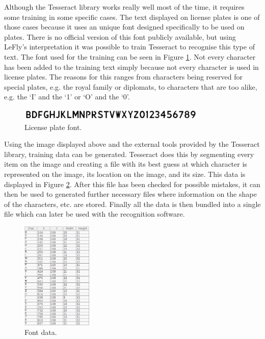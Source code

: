 \clearpage


Although the Tesseract library works really well most of the time, it requires some training in some specific cases. The text displayed on license plates is one of those cases because it uses an unique font designed specifically to be used on plates. There is no official version of this font publicly available, but using LeFly's \cite{lefly} interpretation it was possible to train Tesseract to recognise this type of text. The font used for the training can be seen in Figure \ref{fig:plate-font}. Not every character has been added to the training text simply because not every character is used in license plates. The reasons for this ranges from characters being reserved for special plates, e.g. the royal family or diplomats, to characters that are too alike, e.g. the `I' and the `1' or `O' and the `0'.

\begin{figure}[ht]
    \centering
    \includegraphics[width=0.8\textwidth]{plaatjes/font}
    \caption{License plate font.}
    \label{fig:plate-font}
\end{figure}%

Using the image displayed above and the external tools provided by the Tesseract library, training data can be generated. Tesseract does this by segmenting every item on the image and creating a file with its best guess at which character is represented on the image, its location on the image, and its size. This data is displayed in Figure \ref{fig:text-data}. After this file has been checked for possible mistakes, it can then be used to generated further necessary files where information on the shape of the characters, etc. are stored. Finally all the data is then bundled into a single file which can later be used with the recognition software.

\begin{figure}[H]
    \centering
    \includegraphics[width=0.3\textwidth]{plaatjes/text-data}
    \caption{Font data.}
    \label{fig:text-data}
\end{figure}%

